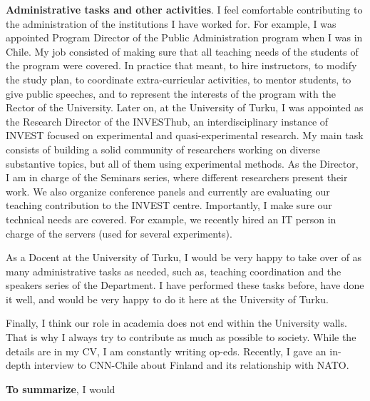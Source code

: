 \documentclass[10pt,stdletter,dateno,sigleft]{newlfm} %
\begin{document}
\begin{newlfm}
{\bf Administrative tasks and other activities}. I feel comfortable contributing to the administration of the institutions I have worked for. For example, I was appointed Program Director of the Public Administration program when I was in Chile. My job consisted of making sure that all teaching needs of the students of the program were covered. In practice that meant, to hire instructors, to modify the study plan, to coordinate extra-curricular activities, to mentor students, to give public speeches, and to represent the interests of the program with the Rector of the University. Later on, at the University of Turku, I was appointed as the Research Director of the INVESThub, an interdisciplinary instance of INVEST focused on experimental and quasi-experimental research. My main task consists of building a solid community of researchers working on diverse substantive topics, but all of them using experimental methods. As the Director, I am in charge of the Seminars series, where different researchers present their work. We also organize conference panels and currently are evaluating our teaching contribution to the INVEST centre. Importantly, I make sure our technical needs are covered. For example, we recently hired an IT person in charge of the servers (used for several experiments).

As a Docent at the University of Turku, I would be very happy to take over of as many administrative tasks as needed, such as, teaching coordination and the speakers series of the Department. I have performed these tasks before, have done it well, and would be very happy to do it here at the University of Turku.

Finally, I think our role in academia does not end within the University walls. That is why I always try to contribute as much as possible to society. While the details are in my CV, I am constantly writing op-eds. Recently, I gave an in-depth interview to CNN-Chile about Finland and its relationship with NATO. 

{\bf To summarize}, I would


{\unskip}

\newpage
\printbibliography



\end{newlfm}
\end{document}
